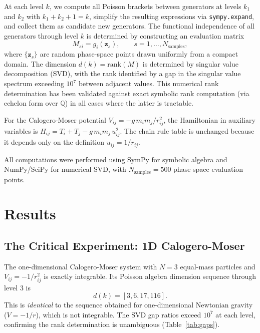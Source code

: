 \documentclass[aps,prl,twocolumn,superscriptaddress,showpacs]{revtex4-2}
\begin{document}
At each level $k$, we compute all Poisson brackets between generators
at levels $k_1$ and $k_2$ with $k_1 + k_2 + 1 = k$, simplify the
resulting expressions via \texttt{sympy.expand}, and collect them as
candidate new generators.  The functional independence of all
generators through level $k$ is determined by constructing an
evaluation matrix
\begin{equation}
  M_{si} = g_i(\bm{z}_s), \qquad
  s = 1, \ldots, N_\text{samples},
  \label{eq:evalmatrix}
\end{equation}
where $\{\bm{z}_s\}$ are random phase-space points drawn uniformly
from a compact domain.  The dimension $d(k) = \mathrm{rank}(M)$ is
determined by singular value decomposition (SVD), with the rank
identified by a gap in the singular value spectrum exceeding
$10^7$ between adjacent values.  This numerical rank determination has
been validated against exact symbolic rank computation
(via echelon form over $\mathbb{Q}$) in all cases where the latter is
tractable.

For the Calogero-Moser potential $V_{ij} = -g\, m_i m_j / r_{ij}^2$,
the Hamiltonian in auxiliary variables is
$H_{ij} = T_i + T_j - g\, m_i m_j \, u_{ij}^2$.  The chain rule
table is unchanged because it depends only on the definition
$u_{ij} = 1/r_{ij}$.

All computations were performed using SymPy for symbolic algebra and
NumPy/SciPy for numerical SVD, with $N_\text{samples} = 500$
phase-space evaluation points.


\section{Results}
\label{sec:results}

\subsection{The Critical Experiment: 1D Calogero-Moser}

The one-dimensional Calogero-Moser system with $N = 3$ equal-mass
particles and $V_{ij} = -1/r_{ij}^2$ is exactly integrable.  Its
Poisson algebra dimension sequence through level 3 is
\begin{equation}
  d(k) = [3, 6, 17, 116].
  \label{eq:CM_result}
\end{equation}
This is \emph{identical} to the sequence obtained for one-dimensional
Newtonian gravity ($V = -1/r$), which is not integrable.  The SVD gap
ratios exceed $10^7$ at each level, confirming the rank determination
is unambiguous (Table~\ref{tab:gaps}).
\end{document}
